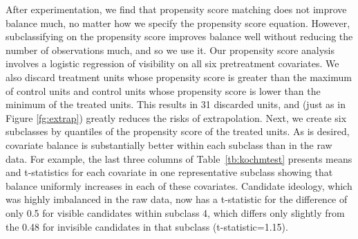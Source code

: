 \documentclass[11pt,titlepage]{article}
\begin{document}
After experimentation, we find that propensity score matching does not
improve balance much, no matter how we specify the propensity score
equation.  However, subclassifying on the propensity score improves
balance well without reducing the number of observations much, and so
we use it.  Our propensity score analysis involves a logistic
regression of visibility on all six pretreatment covariates.  We also
discard treatment units whose propensity score is greater than the
maximum of control units and control units whose propensity score is
lower than the minimum of the treated units.  This results in 31
discarded units, and (just as in Figure \ref{fg:extrap}) greatly
reduces the risks of extrapolation.  Next, we create six subclasses by
quantiles of the propensity score of the treated units.  As is
desired, covariate balance is substantially better within each
subclass than in the raw data.  For example, the last three columns of
Table~\ref{tb:kochmtest} presents means and t-statistics for each
covariate in one representative subclass showing that balance
uniformly increases in each of these covariates.  Candidate ideology,
which was highly imbalanced in the raw data, now has a t-statistic for
the difference of only 0.5 for visible candidates within subclass 4,
which differs only slightly from the 0.48 for invisible candidates in
that subclass (t-statistic=1.15).
\end{document}
